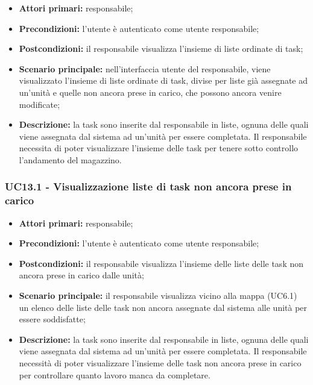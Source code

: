 \begin{itemize}
	\item 	\textbf{Attori primari:} responsabile;
	\item 	\textbf{Precondizioni:} l'utente è autenticato come utente responsabile;
	\item 	\textbf{Postcondizioni:} il responsabile visualizza l'insieme di liste ordinate di task;
	\item 	\textbf{Scenario principale:} nell'interfaccia utente del responsabile, viene visualizzato l'insieme di liste ordinate di task, divise per liste già assegnate ad un'unità e quelle non ancora prese in carico, che possono ancora venire modificate;
	\item 	\textbf{Descrizione:} la task sono inserite dal responsabile in liste, ognuna delle quali viene assegnata dal sistema ad un'unità per essere completata. Il responsabile necessita di poter visualizzare l'insieme delle task per tenere sotto controllo l'andamento del magazzino.

\end{itemize}

\subsubsection{UC13.1 - Visualizzazione liste di task non ancora prese in carico}
\begin{itemize}
	\item 	\textbf{Attori primari:} responsabile;
	\item 	\textbf{Precondizioni:} l'utente è autenticato come utente responsabile;
	\item 	\textbf{Postcondizioni:} il responsabile visualizza l'insieme delle liste delle task non ancora prese in carico dalle unità;
	\item 	\textbf{Scenario principale:} il responsabile visualizza vicino alla mappa (UC6.1) un elenco delle liste delle task non ancora assegnate dal sistema alle unità per essere soddisfatte;
	\item 	\textbf{Descrizione:} la task sono inserite dal responsabile in liste, ognuna delle quali viene assegnata dal sistema ad un'unità per essere completata. Il responsabile necessità di poter visualizzare l'insieme delle task non ancora prese in carico per controllare quanto lavoro manca da completare.


\end{itemize}

